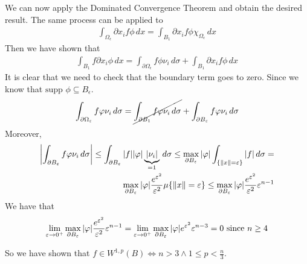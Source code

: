 We can now apply the Dominated Convergence Theorem and obtain the desired result. 
The same process can be applied to
\[
    \begin{split}
        \int_{\Omega_\epsilon} \partial x_i f \phi \, dx = \int_{B_1} \partial x_i f \phi \chi_{\Omega_\epsilon} \, dx
    \end{split}
\]
Then we have shown that 
\[
    \begin{split}
        \int_{B_1} f \partial x_i \phi \, dx = \int_{\partial\Omega_\epsilon} f \phi \nu_i \, d\sigma + \int_{B_1} \partial x_i f \phi \, dx
    \end{split}
\]
It is clear that we need to check that the boundary term goes to zero. Since we know that \(\text{supp } \phi \subseteq B_\epsilon\).
\[
    \begin{split}
        \int_{\partial\Omega_\epsilon} f \phi \nu_i \, d\sigma = \cancel{\int_{\partial B_1} f \phi \nu_i \, d\sigma} + \int_{\partial B_\epsilon} f \phi \nu_i \, d\sigma
    \end{split}
\]
Moreover,
\[
    \begin{split}
        \abs{\int_{\partial B_\epsilon} f \phi \nu_i \, d\sigma} \leq \int_{\partial B_\epsilon} \abs{f} \abs{\phi} \underbrace{\abs{\nu_i}}_{=1} \, d\sigma \leq \max_{\partial B_\epsilon} \abs{\phi} \int_{\{ \norm{x} = \epsilon \}} \abs{f} \, d\sigma = \\
        \max_{\partial B_\epsilon} \abs{\phi} \frac{e^{\epsilon^2}}{\epsilon^2} \mu\{\norm{x} = \epsilon\} \leq \max_{\partial B_\epsilon} \abs{\phi} \frac{e^{\epsilon^2}}{\epsilon^2} \epsilon^{n-1}
    \end{split}
\]
We have that 
\[
    \begin{split}
        \lim_{\epsilon \to 0^+} \max_{\partial B_\epsilon} \abs{\phi} \frac{e^{\epsilon^2}}{\epsilon^2} \epsilon^{n-1} = \lim_{\epsilon \to 0^+} \max_{\partial B_\epsilon} \abs{\phi} e^{\epsilon^2} \epsilon^{n-3} = 0 \text{ since } n \geq 4
    \end{split}
\]

So we have shown that \(f \in W^{1, p}(B) \iff n > 3 \land 1 \leq p < \frac{n}{3}\).

